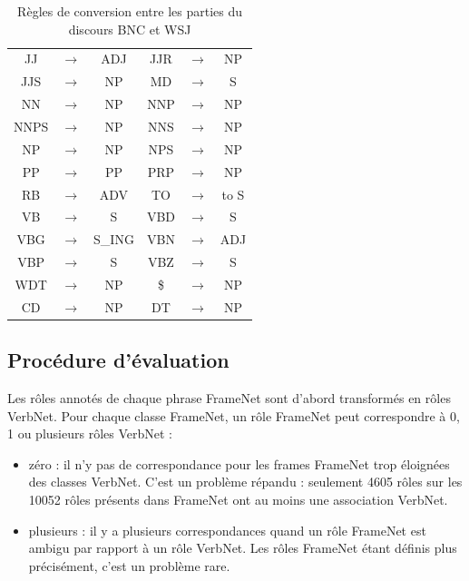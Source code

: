 \begin{table}[ht]
    \centering
    \begin{tabular}{ccc|ccc}
        \toprule
        JJ   &$\to$& ADJ    & JJR  &$\to$& NP     \\
        JJS  &$\to$& NP     & MD   &$\to$& S      \\
        NN   &$\to$& NP     & NNP  &$\to$& NP     \\
        NNPS &$\to$& NP     & NNS  &$\to$& NP     \\
        NP   &$\to$& NP     & NPS  &$\to$& NP     \\
        PP   &$\to$& PP     & PRP  &$\to$& NP     \\  
        RB   &$\to$& ADV    & TO   &$\to$& to S   \\
        VB   &$\to$& S      & VBD  &$\to$& S      \\
        VBG  &$\to$& S\_ING & VBN  &$\to$& ADJ    \\
        VBP  &$\to$& S      & VBZ  &$\to$& S      \\
        WDT  &$\to$& NP     & \$   &$\to$& NP     \\  
        CD   &$\to$& NP     & DT   &$\to$& NP     \\
        \bottomrule
    \end{tabular}
    \caption{\label{table:tagset_rules}Règles de conversion entre les parties du discours BNC et WSJ}
\end{table}

\subsection{Procédure d'évaluation}

Les rôles annotés de chaque phrase FrameNet sont d'abord transformés en rôles
VerbNet. Pour chaque classe FrameNet, un rôle FrameNet peut correspondre à 0, 1
ou plusieurs rôles VerbNet :

\begin{itemize}

    \item zéro : il n'y pas de correspondance pour les frames FrameNet trop
        éloignées des classes VerbNet. C'est un problème répandu :  seulement
        4605 rôles sur les 10052 rôles présents dans FrameNet ont au moins une
        association VerbNet.

    \item plusieurs : il y a plusieurs correspondances quand un rôle FrameNet
        est ambigu par rapport à un rôle VerbNet. Les rôles FrameNet étant
        définis plus précisément, c'est un problème rare.

\end{itemize}

